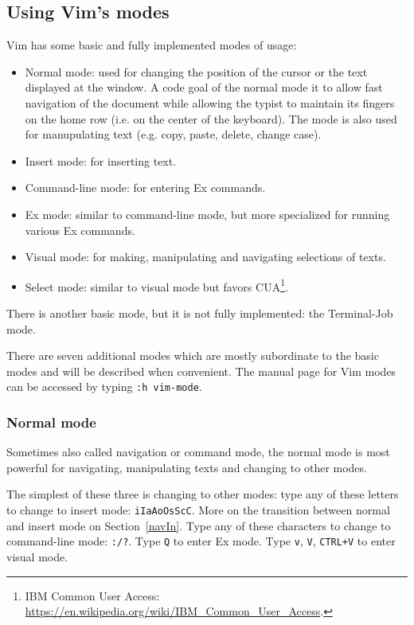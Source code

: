 \documentclass{article}
\begin{document}
\subsection{Using Vim's modes}
Vim has some basic and fully implemented modes of usage:
\begin{itemize}
  \item Normal mode: used for changing
  the position of the cursor or the text displayed
  at the window.
  A code goal of the normal mode it to allow fast
  navigation of the document while allowing
  the typist to maintain its fingers on the home row
  (i.e. on the center of the keyboard).
  The mode is also used for manupulating text
  (e.g. copy, paste, delete, change case).
  \item Insert mode: for inserting text.
  \item Command-line mode: for entering Ex commands.
  \item Ex mode: similar to command-line mode,
  but more specialized for running various Ex commands.
  \item Visual mode: for making, manipulating and navigating
  selections of texts.
  \item Select mode: similar to visual mode but
  favors CUA\footnote{IBM Common User Access: \url{https://en.wikipedia.org/wiki/IBM_Common_User_Access}.}.
\end{itemize}

There is another basic mode, but it is not fully implemented:
the Terminal-Job mode.

There are seven additional modes which are mostly subordinate 
to the basic modes and will be described when convenient.
The manual page for Vim modes can be accessed by typing
\texttt{:h vim-mode}.

\subsubsection{Normal mode}
Sometimes also called navigation or command mode,
the normal mode is most powerful for
navigating, manipulating texts and changing to other modes.

The simplest of these three is changing to other modes:
type any of these letters to change to insert mode:
\texttt{iIaAoOsScC}. More on the transition between
normal and insert mode on Section~\ref{navIn}.
Type any of these characters to change to command-line mode:
\texttt{:/?}.
Type \texttt{Q} to enter Ex mode.
Type \texttt{v}, \texttt{V}, \texttt{CTRL+V} to enter visual mode.
\end{document}
